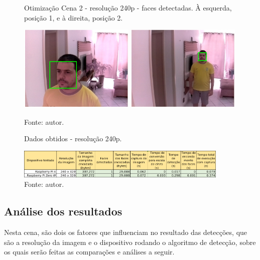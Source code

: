 \begin{figure}[H]
    \centering
    \caption[Otimização Cena 2 - resolução 240p - faces detectadas. À esquerda posição 1 e à direita, posição 2]{Otimização Cena 2 - resolução 240p - faces detectadas. À esquerda, posição 1, e à direita, posição 2.}
    \includegraphics[width=0.49\textwidth]{Cap4_Experimentos_Realizados/Figures/cena2_320x240_pos1_face.jpg}
    \includegraphics[width=0.49\textwidth]{Cap4_Experimentos_Realizados/Figures/cena2_320x240_pos2_face.jpg}
    \caption*{Fonte: autor.}
    \label{fig:otimizacaoCena2_240p_faces}
\end{figure}

\begin{figure}[H]
    \centering
    \caption[Dados obtidos - resolução 240p.]{Dados obtidos - resolução 240p.}
    \includegraphics[width=0.90\textwidth]{Cap4_Experimentos_Realizados/Figures/cena2_dados_240p_br.jpg}
    \caption*{Fonte: autor.}
    \label{fig:dadosCena2_240p}
\end{figure}

\subsection{Análise dos resultados}

Nesta cena, são dois os fatores que influenciam no resultado das detecções, que são a resolução da imagem e o dispositivo rodando o algoritmo de detecção, sobre os quais serão feitas as comparações e análises a seguir.

